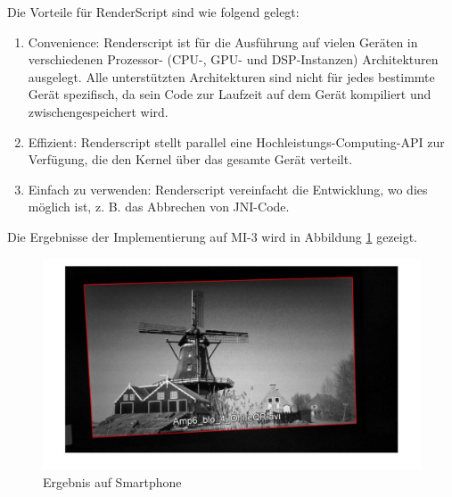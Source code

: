 Die Vorteile für RenderScript sind wie folgend gelegt:
\begin{enumerate}
 \item Convenience: Renderscript ist für die Ausführung auf vielen Geräten in verschiedenen Prozessor- (CPU-, GPU- und DSP-Instanzen) Architekturen ausgelegt. Alle unterstützten Architekturen sind nicht für jedes bestimmte Gerät spezifisch, da sein Code zur Laufzeit auf dem Gerät kompiliert und zwischengespeichert wird.
 \item Effizient: Renderscript stellt parallel eine Hochleistungs-Computing-API zur Verfügung, die den Kernel über das gesamte Gerät verteilt.
 \item Einfach zu verwenden: Renderscript vereinfacht die Entwicklung, wo dies möglich ist, z. B. das Abbrechen von JNI-Code.
\end{enumerate}

Die Ergebnisse der Implementierung auf MI-3 wird in Abbildung \ref{fig:Ergebnis3} gezeigt.

\begin{figure}[H]
 \centering 
  \includegraphics[keepaspectratio,width=1.0\textwidth]{images/5_Implementirung/2/modulation.pdf}
 \caption{Ergebnis auf Smartphone}
 \label{fig:Ergebnis3}
\end{figure}
